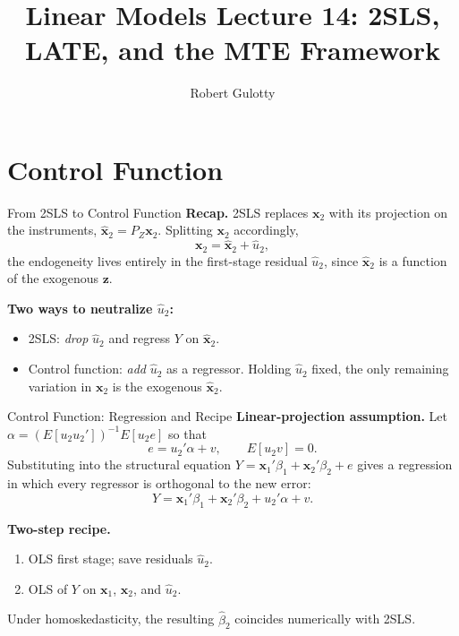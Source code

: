 \documentclass[aspectratio=169, handout]{beamer}
\title[PLSC 30700]{Linear Models Lecture 14: 2SLS, LATE, and the MTE Framework}
\author{Robert Gulotty}
\institute[Chicago]{University of Chicago}
\numberwithin{equation}{section}
\begin{document}
\begin{frame}
\maketitle
\end{frame}

\section{Control Function}

\begin{frame}{From 2SLS to Control Function}
\textbf{Recap.}  2SLS replaces $\bm{x}_2$ with its projection on the instruments, $\hat{\bm{x}}_2=P_Z\bm{x}_2$.  Splitting $\bm{x}_2$ accordingly,
$$\bm{x}_2=\hat{\bm{x}}_2+\hat{u}_2,$$
the endogeneity lives entirely in the first-stage residual $\hat{u}_2$, since $\hat{\bm{x}}_2$ is a function of the exogenous $\bm{z}$.

\medskip
\textbf{Two ways to neutralize $\hat{u}_2$:}
\begin{itemize}
\item \alert{2SLS:} \emph{drop} $\hat{u}_2$ and regress $Y$ on $\hat{\bm{x}}_2$.
\item \alert{Control function:} \emph{add} $\hat{u}_2$ as a regressor.  Holding $\hat{u}_2$ fixed, the only remaining variation in $\bm{x}_2$ is the exogenous $\hat{\bm{x}}_2$.
\end{itemize}
\end{frame}


\begin{frame}{Control Function: Regression and Recipe}
\textbf{Linear-projection assumption.}  Let $\alpha=(E[u_2u_2'])^{-1}E[u_2e]$ so that
$$e=u_2'\alpha+v,\qquad E[u_2v]=0.$$
Substituting into the structural equation $Y=\bm{x}_1'\beta_1+\bm{x}_2'\beta_2+e$ gives a regression in which every regressor is orthogonal to the new error:
$$Y=\bm{x}_1'\beta_1+\bm{x}_2'\beta_2+u_2'\alpha+v.$$

\medskip
\textbf{Two-step recipe.}
\begin{enumerate}
\item OLS first stage; save residuals $\hat{u}_2$.
\item OLS of $Y$ on $\bm{x}_1$, $\bm{x}_2$, and $\hat{u}_2$.
\end{enumerate}
Under homoskedasticity, the resulting $\hat{\beta}_2$ coincides numerically with 2SLS.
\end{frame}
\end{document}
